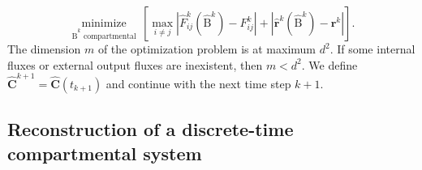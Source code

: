 \documentclass[11pt,a4paper]{article}
\renewcommand{\vec}[1]{\mathbf{#1}}
\newcommand{\tens}[1]{\mathrm{#1}}
\begin{document}
        \begin{equation*}
            \underset{\widehat{\tens{B}}^k\text{ compartmental}}{\operatorname{minimize}}\,\left[\max\limits_{i\neq j} |\widehat{F}^k_{ij}(\widehat{\tens{B}}^k)-F^k_{ij}| + |\widehat{\vec{r}}^k(\widehat{\tens{B}}^k)-\vec{r}^k|\right].
        \end{equation*}
        The dimension $m$ of the optimization problem is at maximum $d^2$.
        If some internal fluxes or external output fluxes are inexistent, then $m<d^2$.
        We define $\widehat{\vec{C}}^{k+1}=\widehat{\vec{C}}(t_{k+1})$ and continue with the next time step $k+1$.\\
       
\subsection{Reconstruction of a discrete-time compartmental system}
    
\end{document}

